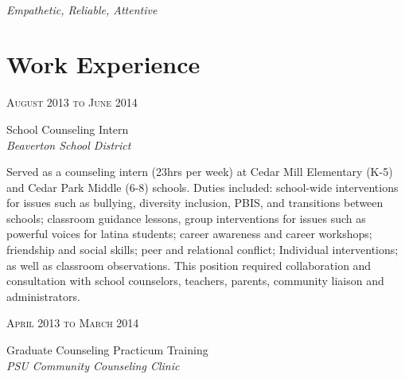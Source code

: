 \documentclass[10pt]{article} %
\begin{document}
\color{text1} %

\par{\\ %
{\color{headings} 
\textit{Empathetic, Reliable, Attentive}
 \\[15pt]\par} %
	

\begin{minipage}[t]{0.5\textwidth} %
\vspace{0pt} %
	
\section{Work Experience} 

{\raggedleft\textsc{August 2013 to June 2014}\par}
{\raggedright\large School Counseling Intern\\
\textit{Beaverton School District}\\[5pt]}

\normalsize{
Served as a counseling intern (23hrs per week) at Cedar Mill Elementary (K-5) and Cedar Park Middle (6-8) schools. Duties included: school-wide interventions for issues such as bullying, diversity inclusion, PBIS, and transitions between schools; classroom guidance lessons, group interventions for issues such as powerful voices for latina students; career awareness and career workshops; friendship and social skills; peer and relational conflict; Individual interventions; as well as classroom observations. This position required collaboration and consultation with school counselors, teachers, parents, community liaison and administrators.
}\\


{\raggedleft\textsc{April 2013 to March 2014}\par}
{\raggedright\large Graduate Counseling Practicum Training\\
\textit{PSU Community Counseling Clinic}\\[5pt]}


\end{minipage}}
\end{document}
